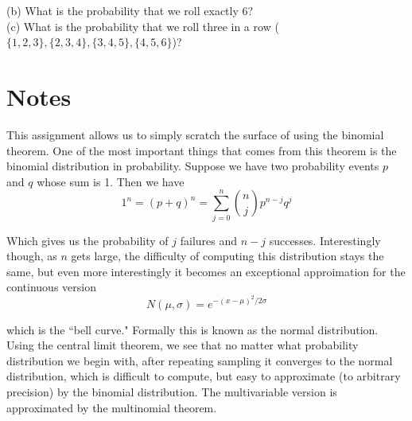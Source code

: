 \documentclass[16 pt]{amsart}
\theoremstyle{definition}
\theoremstyle{remark}
\numberwithin{equation}{subsection}
\begin{document}
(b) What is the probability that we roll exactly 6?\\

(c) What is the probability that we roll three in a row ($\{1,2,3\},\{2,3,4\},\{3,4,5\},\{4,5,6\}$)?

\newpage

\section{Notes}

This assignment allows us to simply scratch the surface of using the binomial theorem.  One of the most important things that comes from this theorem is the binomial distribution in probability.  Suppose we have two probability events $p$ and $q$ whose sum is 1.  Then we have
\[
1^n = (p+q)^n = \sum_{j=0}^{n}\binom{n}{j}p^{n-j}q^j
\]

Which gives us the probability of $j$ failures and $n-j$ successes.  Interestingly though, as $n$ gets large, the difficulty of computing this distribution stays the same, but even more interestingly it becomes an exceptional approimation for the continuous version
\[
N(\mu,\sigma) = e^{-(x-\mu)^2/2\sigma}
\]

which is the ``bell curve."  Formally this is known as the normal distribution.  Using the central limit theorem, we see that no matter what probability distribution we begin with, after repeating sampling it converges to the normal distribution, which is difficult to compute, but easy to approximate (to arbitrary precision) by the binomial distribution.  The multivariable version is approximated by the multinomial theorem.
\end{document}
